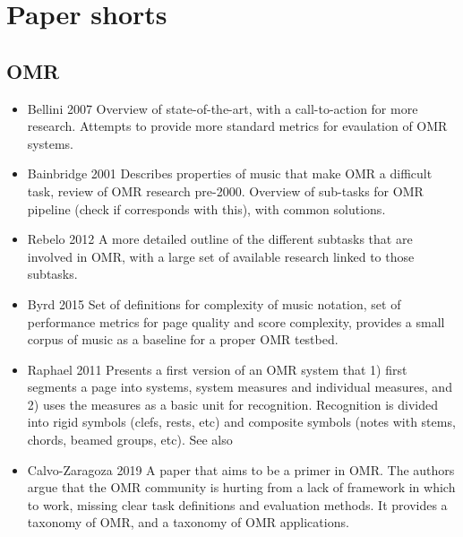 \section{Paper shorts}

\subsection{OMR}
\begin{itemize}
    \item Bellini 2007 \citep{Bellini2007} Overview of state-of-the-art, with a call-to-action for more research. Attempts to provide more standard metrics for evaulation of OMR systems.
    \item Bainbridge 2001 \citep{Bainbridge2001} Describes properties of music that make OMR a difficult task, review of OMR research pre-2000. Overview of sub-tasks for OMR pipeline (check if \citep{Rebelo2012} corresponds with this), with common solutions.
    \item Rebelo 2012\citep{Rebelo2012} A more detailed outline of the different subtasks that are involved in OMR, with a large set of available research linked to those subtasks. \citep{}
    \item Byrd 2015 \citep{Byrd2015} Set of definitions for complexity of music notation, set of performance metrics for page quality and score complexity, provides a small corpus of music as a baseline for a proper OMR testbed. 
    \item Raphael 2011 \citep{Raphael2011} Presents a first version of an OMR system that 1) first segments a page into systems, system measures and individual measures, and 2) uses the measures as a basic unit for recognition. Recognition is divided into rigid symbols (clefs, rests, etc) and composite symbols (notes with stems, chords, beamed groups, etc). See also \citep{Chen2016}
   \item Calvo-Zaragoza 2019 \citep{CalvoZaragoza2019} A paper that aims to be a primer in OMR. The authors argue that the OMR community is hurting from a lack of framework in which to work, missing clear task definitions and evaluation methods. It provides a taxonomy of OMR, and a taxonomy of OMR applications.
\end{itemize}

